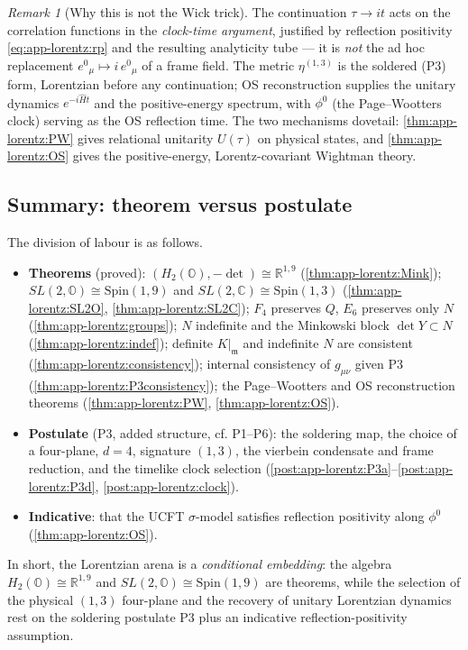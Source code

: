 \documentclass[11pt]{article}
\theoremstyle{plain}
\theoremstyle{definition}
\theoremstyle{remark}
\newtheorem{remark}[theorem]{Remark}
\begin{document}
\begin{remark}[Why this is not the Wick trick]
\label{rmk:app-lorentz:notwick}
The continuation $\tau\to it$ acts on the correlation functions in the
\emph{clock-time argument}, justified by reflection positivity
\eqref{eq:app-lorentz:rp} and the resulting analyticity tube --- it is \emph{not} the
ad hoc replacement $e^{0}{}_{\mu}\mapsto i\,e^{0}{}_{\mu}$ of a frame field. The
metric $\eta^{(1,3)}$ is the soldered (P3) form, Lorentzian before any continuation;
OS reconstruction supplies the unitary dynamics $e^{-i\hat{H}t}$ and the
positive-energy spectrum, with $\phi^{0}$ (the Page--Wootters clock) serving as the
OS reflection time. The two mechanisms dovetail:
\autoref{thm:app-lorentz:PW} gives relational unitarity $U(\tau)$ on physical states,
and \autoref{thm:app-lorentz:OS} gives the positive-energy, Lorentz-covariant
Wightman theory.
\end{remark}

\subsection{Summary: theorem versus postulate}
\label{subsec:app-lorentz:summary}

The division of labour is as follows.
\begin{itemize}
\item \textbf{Theorems} (proved): $(H_{2}(\mathbb{O}),-\det)\cong\mathbb{R}^{1,9}$
  (\autoref{thm:app-lorentz:Mink}); $SL(2,\mathbb{O})\cong\mathrm{Spin}(1,9)$ and
  $SL(2,\mathbb{C})\cong\mathrm{Spin}(1,3)$
  (\autoref{thm:app-lorentz:SL2O}, \autoref{thm:app-lorentz:SL2C}); $F_{4}$ preserves
  $Q$, $E_{6}$ preserves only $N$ (\autoref{thm:app-lorentz:groups}); $N$ indefinite
  and the Minkowski block $\det Y\subset N$ (\autoref{thm:app-lorentz:indef});
  definite $K|_{\mathfrak{m}}$ and indefinite $N$ are consistent
  (\autoref{thm:app-lorentz:consistency}); internal consistency of $g_{\mu\nu}$ given
  P3 (\autoref{thm:app-lorentz:P3consistency}); the Page--Wootters and OS
  reconstruction theorems (\autoref{thm:app-lorentz:PW}, \autoref{thm:app-lorentz:OS}).
\item \textbf{Postulate} (P3, added structure, cf. P1--P6): the soldering map, the
  choice of a four-plane, $d=4$, signature $(1,3)$, the vierbein condensate and frame
  reduction, and the timelike clock selection
  (\autoref{post:app-lorentz:P3a}--\autoref{post:app-lorentz:P3d},
  \autoref{post:app-lorentz:clock}).
\item \textbf{Indicative}: that the UCFT $\sigma$-model satisfies reflection
  positivity along $\phi^{0}$ (\autoref{thm:app-lorentz:OS}).
\end{itemize}
In short, the Lorentzian arena is a \emph{conditional embedding}: the algebra
$H_{2}(\mathbb{O})\cong\mathbb{R}^{1,9}$ and $SL(2,\mathbb{O})\cong\mathrm{Spin}(1,9)$
are theorems, while the selection of the physical $(1,3)$ four-plane and the recovery
of unitary Lorentzian dynamics rest on the soldering postulate P3 plus an indicative
reflection-positivity assumption.
\end{document}
